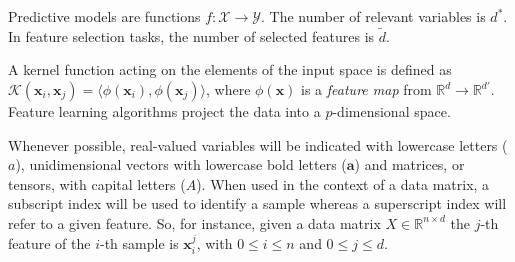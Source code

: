 Predictive models are functions $f: \mathcal{X} \rightarrow \mathcal{Y}$.
The number of relevant variables is $d^*$.
In feature selection tasks, the number of selected features is $\tilde d$.

A kernel function acting on the elements of the input space is defined as $\mathcal{K}(\bm{x}_{i},\bm{x}_{j})=\langle \phi(\bm{x}_{i}), \phi(\bm{x}_{j})\rangle$, where $\phi(\bm{x})$ is a {\em feature map} from $\mathds{R}^d \rightarrow \mathds{R}^{d'}$.
Feature learning algorithms project the data into a $p$-dimensional space.

Whenever possible,
real-valued variables will be indicated with lowercase letters (\eg $a$),
unidimensional vectors with lowercase bold letters (\eg $\bm{a}$) and
matrices, or tensors, with capital letters (\eg $A$).
When used in the context of a data matrix, a subscript index will be used to identify a sample whereas a superscript index will refer to a given feature.
So, for instance, given a data matrix $X \in \mathbb{R}^{n \times d}$ the $j$-th feature of the $i$-th sample is $\bm{x}_i^j$, with $0 \leq i \leq n$ and $0\leq j\leq d$.
